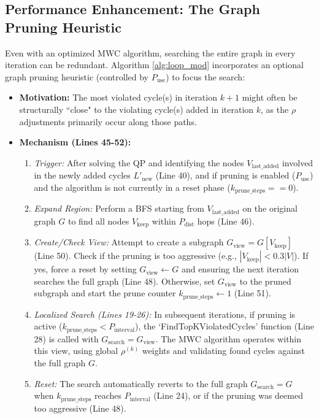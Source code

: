 \documentclass{article}
\begin{document}
\subsection{Performance Enhancement: The Graph Pruning Heuristic}
\label{subsec:pruning_heuristic} %

Even with an optimized MWC algorithm, searching the entire graph in every iteration can be redundant. Algorithm \ref{alg:loop_mod} incorporates an optional graph pruning heuristic (controlled by $P_{\text{use}}$) to focus the search:

\begin{itemize}
    \item \textbf{Motivation:} The most violated cycle(s) in iteration $k+1$ might often be structurally ``close" to the violating cycle(s) added in iteration $k$, as the $\rho$ adjustments primarily occur along those paths.
    \item \textbf{Mechanism (Lines 45-52):}
        \begin{enumerate}
            \item \textit{Trigger:} After solving the QP and identifying the nodes $V_{\text{last\_added}}$ involved in the newly added cycles $L'_{\text{new}}$ (Line 40), and if pruning is enabled ($P_{\text{use}}$) and the algorithm is not currently in a reset phase ($k_{\text{prune\_steps}} == 0$).
            \item \textit{Expand Region:} Perform a BFS starting from $V_{\text{last\_added}}$ on the original graph $G$ to find all nodes $V_{\text{keep}}$ within $P_{\text{dist}}$ hops (Line 46).
            \item \textit{Create/Check View:} Attempt to create a subgraph $G_{\text{view}} = G[V_{\text{keep}}]$ (Line 50). Check if the pruning is too aggressive (e.g., $|V_{\text{keep}}| < 0.3 |V|$). If yes, force a reset by setting $G_{\text{view}} \gets G$ and ensuring the next iteration searches the full graph (Line 48). Otherwise, set $G_{\text{view}}$ to the pruned subgraph and start the prune counter $k_{\text{prune\_steps}} \gets 1$ (Line 51).
            \item \textit{Localized Search (Lines 19-26):} In subsequent iterations, if pruning is active ($k_{\text{prune\_steps}} < P_{\text{interval}}$), the `FindTopKViolatedCycles' function (Line 28) is called with $G_{\text{search}} = G_{\text{view}}$. The MWC algorithm operates within this view, using global $\rho^{(k)}$ weights and validating found cycles against the full graph $G$.
            \item \textit{Reset:} The search automatically reverts to the full graph $G_{\text{search}} = G$ when $k_{\text{prune\_steps}}$ reaches $P_{\text{interval}}$ (Line 24), or if the pruning was deemed too aggressive (Line 48).
        \end{enumerate}
\end{itemize}
\end{document}
